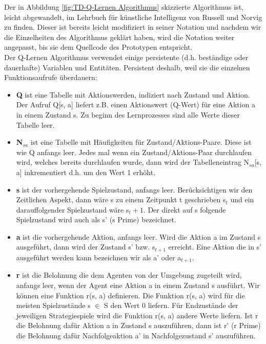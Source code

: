 Der in Abbildung \ref{fig:TD-Q-Lernen Algorithmus} skizzierte Algorithmus ist, leicht abgewandelt, im Lehrbuch für künstliche Intelligenz von Russell und Norvig \cite[974]{Russell} zu finden. Dieser ist bereits leicht modifiziert in seiner Notation und nachdem wir die Einzelheiten des Algorithmus geklärt haben, wird die Notation weiter angepasst, bis sie dem Quellcode des Prototypen entspricht. \\

Der Q-Lernen Algorithmus verwendet einige persistente (d.h. beständige oder dauerhafte) Variablen und Entitäten. Persistent deshalb, weil sie die einzelnen Funktionsaufrufe überdauern: 
\begin{itemize}

\item \textbf{Q} ist eine Tabelle mit Aktionswerden, indiziert nach Zustand und Aktion. Der Aufruf Q[s, a] liefert z.B. einen Aktionswert (Q-Wert) für eine Aktion a in einem Zustand s. Zu beginn des Lernprozesses sind alle Werte dieser Tabelle leer.

\item \textbf{N$_{sa}$} ist eine Tabelle mit Häufigkeiten für Zustand/Aktions-Paare.  Diese ist wie Q anfangs leer. Jedes mal wenn ein Zustand/Aktions-Paar durchlaufen wird, welches bereits durchlaufen wurde, dann wird der Tabelleneintrag N$_{sa}$[s, a] inkrementiert d.h. um den Wert 1 erhöht.

\item \textbf{s} ist der vorhergehende Spielzustand, anfangs leer. Berücksichtigen wir den Zeitlichen Aspekt, dann wäre s zu einem Zeitpunkt t geschrieben s${_t}$ und ein darauffolgender Spielzustand wäre s${_t+1}$. Der direkt auf s folgende Spielzustand wird auch als s' (s Prime) bezeichnet.

\item \textbf{a} ist die vorhergehende Aktion, anfangs leer. Wird die Aktion a im Zustand s ausgeführt, dann wird der Zustand s' bzw. s$_{t+1}$ erreicht. Eine Aktion die in s' ausgeführt werden kann bezeichnen wir als a' oder a$_{t+1}$.

\item \textbf{r} ist die Belohnung die dem Agenten von der Umgebung zugeteilt wird, anfangs leer, wenn der Agent eine Aktion a in einem Zustand s ausführt. Wir können eine Funktion r(s, a) definieren. Die Funktion r(s, a) wird für die meisten Spielzustände s $\in$ S den Wert 0 liefern. Für Endzustände der jeweiligen Strategiespiele wird die Funktion r(s, a) andere Werte liefern. Ist r die Belohnung dafür Aktion a in Zustand s auszuführen, dann ist r' (r Prime) die Belohnung dafür Nachfolgeaktion a' in Nachfolgezustand s' auszuführen.
\end{itemize}

